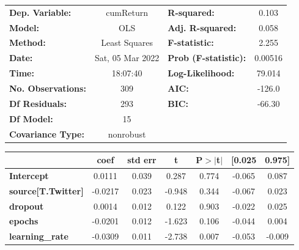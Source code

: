 \begin{center}
\begin{tabular}{lclc}
\toprule
\textbf{Dep. Variable:}              &    cumReturn     & \textbf{  R-squared:         } &     0.103   \\
\textbf{Model:}                      &       OLS        & \textbf{  Adj. R-squared:    } &     0.058   \\
\textbf{Method:}                     &  Least Squares   & \textbf{  F-statistic:       } &     2.255   \\
\textbf{Date:}                       & Sat, 05 Mar 2022 & \textbf{  Prob (F-statistic):} &  0.00516    \\
\textbf{Time:}                       &     18:07:40     & \textbf{  Log-Likelihood:    } &    79.014   \\
\textbf{No. Observations:}           &         309      & \textbf{  AIC:               } &    -126.0   \\
\textbf{Df Residuals:}               &         293      & \textbf{  BIC:               } &    -66.30   \\
\textbf{Df Model:}                   &          15      & \textbf{                     } &             \\
\textbf{Covariance Type:}            &    nonrobust     & \textbf{                     } &             \\
\bottomrule
\end{tabular}
\begin{tabular}{lcccccc}
                                     & \textbf{coef} & \textbf{std err} & \textbf{t} & \textbf{P$> |$t$|$} & \textbf{[0.025} & \textbf{0.975]}  \\
\midrule
\textbf{Intercept}                   &       0.0111  &        0.039     &     0.287  &         0.774        &       -0.065    &        0.087     \\
\textbf{source[T.Twitter]}           &      -0.0217  &        0.023     &    -0.948  &         0.344        &       -0.067    &        0.023     \\
\textbf{dropout}                     &       0.0014  &        0.012     &     0.122  &         0.903        &       -0.022    &        0.025     \\
\textbf{epochs}                      &      -0.0201  &        0.012     &    -1.623  &         0.106        &       -0.044    &        0.004     \\
\textbf{learning\_rate}              &      -0.0309  &        0.011     &    -2.738  &         0.007        &       -0.053    &       -0.009     \\

\end{tabular}
\end{center}
